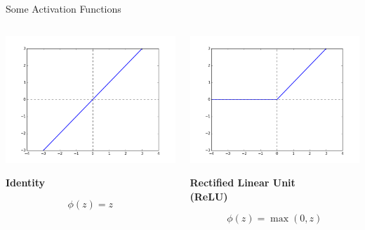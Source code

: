 \documentclass[11pt,handout,aspectratio=169]{beamer}
\begin{document}
\begin{frame}{Some Activation Functions}
  \begin{columns}
    \begin{column}{0.25 \linewidth}
      \includegraphics[width=\linewidth]{pics/act_lin.png}
      \begin{center}
        {\bf Identity}
      \end{center}
      \[ \phi(z) = z \]
    \end{column}

    \begin{column}{0.4 \linewidth}
    \centering
      \includegraphics[width=0.8\linewidth]{pics/act_relu.png}
      \begin{center}
        {\bf Rectified Linear Unit} \\
        {\bf (ReLU)}
      \end{center}
      \[ \phi(z) = \max(0, z) \]
    \end{column}


\end{columns}
\end{frame}
\end{document}
